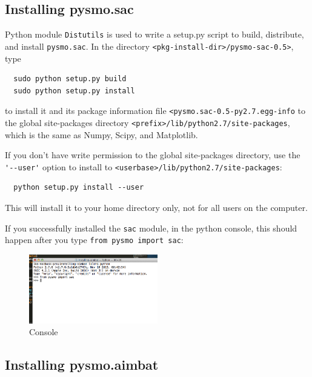 \documentclass[letterpaper,10pt]{article}
\begin{document}
\subsection{Installing pysmo.sac}

Python module \verb"Distutils" is used to write a setup.py script to build, distribute, and install \verb"pysmo.sac". In the directory \verb"<pkg-install-dir>/pysmo-sac-0.5>", type 

\begin{verbatim}
  sudo python setup.py build
  sudo python setup.py install
\end{verbatim}

to install it and its package information file \verb"<pysmo.sac-0.5-py2.7.egg-info" to the global site-packages directory \verb"<prefix>/lib/python2.7/site-packages", which is the same as Numpy, Scipy, and Matplotlib.

If you don't have write permission to the global site-packages directory, use the \verb"'--user'" option to install to \verb"<userbase>/lib/python2.7/site-packages":

\begin{verbatim}
  python setup.py install --user
\end{verbatim}

This will install it to your home directory only, not for all users on the computer. 

If you successfully installed the \verb"sac" module, in the python console, this should happen after you type \verb"from pysmo import sac": 

\begin{figure}[h!]
  \centering
  \includegraphics[width=0.5\textwidth]{images/sac_installed}
  \caption{Console}
  \label{fig:sac_installed}
\end{figure}


\subsection{Installing pysmo.aimbat}
\end{document}
